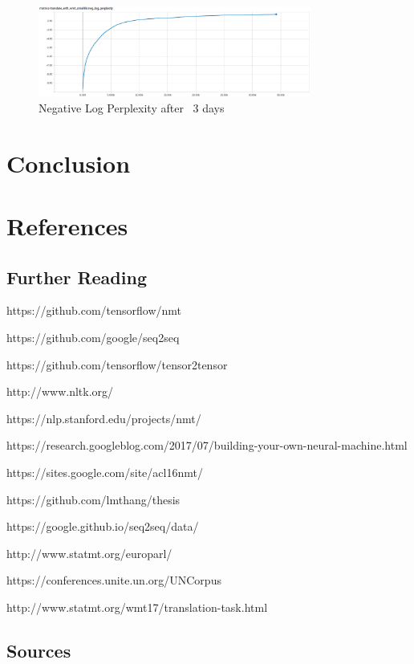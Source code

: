 \documentclass[10pt,a4paper]{article}
\begin{document}
\begin{figure}[H]
  \begin{center}
    \includegraphics[width=0.8\textwidth] {neg_log_perp.png}
    \caption{Negative Log Perplexity after ~3 days}
  \end{center}
\end{figure}

\section{Conclusion}


\clearpage


\section{References}

\subsection{Further Reading}

https://github.com/tensorflow/nmt

https://github.com/google/seq2seq

https://github.com/tensorflow/tensor2tensor

http://www.nltk.org/

https://nlp.stanford.edu/projects/nmt/

https://research.googleblog.com/2017/07/building-your-own-neural-machine.html

https://sites.google.com/site/acl16nmt/

https://github.com/lmthang/thesis

https://google.github.io/seq2seq/data/

http://www.statmt.org/europarl/

https://conferences.unite.un.org/UNCorpus

http://www.statmt.org/wmt17/translation-task.html

\subsection{Sources}
\end{document}
